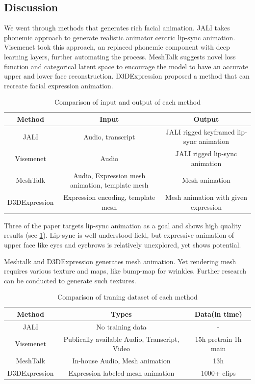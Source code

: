 \documentclass[10pt,twocolumn,letterpaper]{article}
\begin{document}
\subsection{Discussion}

We went through methods that generates rich facial animation. JALI takes phonemic approach to generate realistic animator centric lip-sync animation. Visemenet took this approach, an replaced phonemic component with deep learning layers, further automating the process. MeshTalk suggests novel loss function and categorical latent space to encourage the model to have an accurate upper and lower face reconstruction. D3DExpression proposed a method that can recreate facial expression animation.

\begin{table}
   \centering
   \begin{tabular}{c|cc}
      \toprule
      Method & Input & Output \\
      \midrule
      JALI & Audio, transcript & JALI rigged keyframed lip-sync animation \\
      Visemenet & Audio & JALI rigged lip-sync animation \\
      MeshTalk & Audio, Expression mesh animation, template mesh & Mesh animation\\
      D3DExpression & Expression encoding, template mesh & Mesh animation with given expression\\
      \bottomrule
   \end{tabular}
   \caption{Comparison of input and output of each method}
   \label{table:io_cmp}
\end{table}

Three of the paper targets lip-sync animation as a goal and shows high quality results (see \cref*{table:io_cmp}). Lip-sync is well understood field, but expressive animation of upper face like eyes and eyebrows is relatively unexplored, yet shows potential.

Meshtalk and D3DExpression generates mesh animation. Yet rendering mesh requires various texture and maps, like bump-map for wrinkles. Further research can be conducted to generate such textures.

\begin{table}
   \centering
   \begin{tabular}{c|cc}
      \toprule
      Method & Types & Data(in time) \\
      \midrule
      JALI & No training data & - \\
      Visemenet & Publically available Audio, Transcript, Video & 15h pretrain 1h main \\
      MeshTalk & In-house Audio, Mesh animation & 13h \\
      D3DExpression & Expression labeled mesh animation & 1000+ clips\\
      \bottomrule
   \end{tabular}
   \caption{Comparison of traning dataset of each method}
   \label{table:data_cmp}
\end{table}


{\small


}
\end{document}
